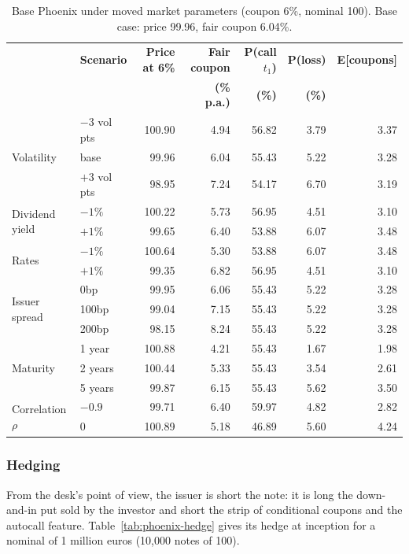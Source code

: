 \documentclass[11pt,a4paper]{article}
\begin{document}
\begin{table}[htbp]
\centering
\small
\begin{tabular}{@{}llrrrrr@{}}
\toprule
 & \textbf{Scenario} & \textbf{Price at 6\%} & \textbf{Fair coupon} & \textbf{P(call $t_1$)} & \textbf{P(loss)} & \textbf{E[coupons]} \\
 & & & \textbf{(\% p.a.)} & \textbf{(\%)} & \textbf{(\%)} & \\
\midrule
\multirow{3}{*}{Volatility} & $-3$ vol pts & 100.90 & 4.94 & 56.82 & 3.79 & 3.37 \\
 & base & 99.96 & 6.04 & 55.43 & 5.22 & 3.28 \\
 & $+3$ vol pts & 98.95 & 7.24 & 54.17 & 6.70 & 3.19 \\
\midrule
\multirow{2}{*}{Dividend yield} & $-1\%$ & 100.22 & 5.73 & 56.95 & 4.51 & 3.10 \\
 & $+1\%$ & 99.65 & 6.40 & 53.88 & 6.07 & 3.48 \\
\midrule
\multirow{2}{*}{Rates} & $-1\%$ & 100.64 & 5.30 & 53.88 & 6.07 & 3.48 \\
 & $+1\%$ & 99.35 & 6.82 & 56.95 & 4.51 & 3.10 \\
\midrule
\multirow{3}{*}{Issuer spread} & 0bp & 99.95 & 6.06 & 55.43 & 5.22 & 3.28 \\
 & 100bp & 99.04 & 7.15 & 55.43 & 5.22 & 3.28 \\
 & 200bp & 98.15 & 8.24 & 55.43 & 5.22 & 3.28 \\
\midrule
\multirow{3}{*}{Maturity} & 1 year & 100.88 & 4.21 & 55.43 & 1.67 & 1.98 \\
 & 2 years & 100.44 & 5.33 & 55.43 & 3.54 & 2.61 \\
 & 5 years & 99.87 & 6.15 & 55.43 & 5.62 & 3.50 \\
\midrule
\multirow{2}{*}{Correlation $\rho$} & $-0.9$ & 99.71 & 6.40 & 59.97 & 4.82 & 2.82 \\
 & $0$ & 100.89 & 5.18 & 46.89 & 5.60 & 4.24 \\
\bottomrule
\end{tabular}
\caption{Base Phoenix under moved market parameters (coupon 6\%, nominal 100). Base case: price 99.96, fair coupon
6.04\%.}
\label{tab:phoenix-market}
\end{table}

\clearpage
\subsubsection{Hedging}

From the desk's point of view, the issuer is short the note: it is long the down-and-in put sold by the investor and
short the strip of conditional coupons and the autocall feature. Table~\ref{tab:phoenix-hedge} gives its hedge at
inception for a nominal of 1 million euros (10{,}000 notes of 100).
\end{document}
